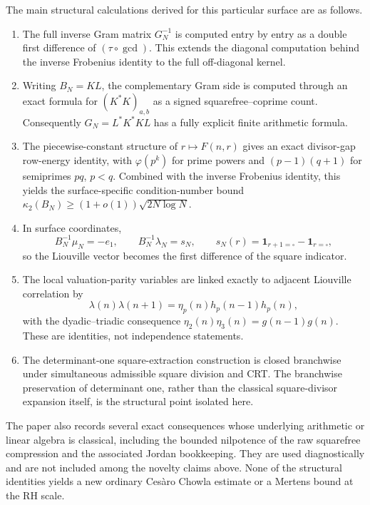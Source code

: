 \documentclass[11pt]{amsart}
\numberwithin{equation}{section}
\theoremstyle{plain}
\theoremstyle{definition}
\theoremstyle{remark}
\newcommand{\one}{\mathbf 1}
\newcommand{\mob}{\mu}
\newcommand{\liou}{\lambda}
\begin{document}
The main structural calculations derived for this particular surface are as follows.
\begin{enumerate}[label=(\roman*)]
\item The full inverse Gram matrix $G_N^{-1}$ is computed entry by entry as a double first difference of $(\tau\circ\gcd)$.  This extends the diagonal computation behind the inverse Frobenius identity to the full off-diagonal kernel.
\item Writing $B_N=KL$, the complementary Gram side is computed through an exact formula for $(K^*K)_{a,b}$ as a signed squarefree--coprime count.  Consequently $G_N=L^*K^*KL$ has a fully explicit finite arithmetic formula.
\item The piecewise-constant structure of $r\mapsto F(n,r)$ gives an exact divisor-gap row-energy identity, with $\varphi(p^k)$ for prime powers and $(p-1)(q+1)$ for semiprimes $pq$, $p<q$.  Combined with the inverse Frobenius identity, this yields the surface-specific condition-number bound $\kappa_2(B_N)\ge(1+o(1))\sqrt{2N\log N}$.
\item In surface coordinates,
\begin{equation}
B_N^{-1}\mob_N=-e_1,
\qquad
B_N^{-1}\liou_N=s_N,
\qquad
s_N(r)=\one_{r+1=\square}-\one_{r=\square},
\label{eq:mu_lambda_coordinate_preview}
\end{equation}
so the Liouville vector becomes the first difference of the square indicator.
\item The local valuation-parity variables are linked exactly to adjacent Liouville correlation by
\begin{equation}
\liou(n)\liou(n+1)=\eta_p(n)h_p(n-1)h_p(n),
\label{eq:intro_eta_lambda_bridge}
\end{equation}
with the dyadic--triadic consequence $\eta_2(n)\eta_3(n)=g(n-1)g(n)$.  These are identities, not independence statements.
\item The determinant-one square-extraction construction is closed branchwise under simultaneous admissible square division and CRT.  The branchwise preservation of determinant one, rather than the classical square-divisor expansion itself, is the structural point isolated here.
\end{enumerate}

The paper also records several exact consequences whose underlying arithmetic or linear algebra is classical, including the bounded nilpotence of the raw squarefree compression and the associated Jordan bookkeeping.  They are used diagnostically and are not included among the novelty claims above.  None of the structural identities yields a new ordinary Cesàro Chowla estimate or a Mertens bound at the RH scale.
\end{document}
